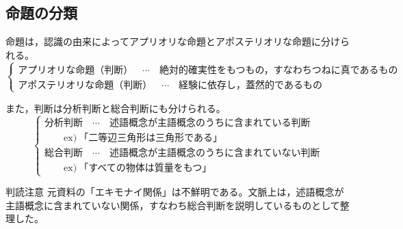 \documentclass[../main.tex]{subfiles}
\begin{document}
\subsection{命題の分類}

命題は，認識の由来によってアプリオリな命題とアポステリオリな命題に分けられる。
\[
  \left\{
  \begin{array}{l}
    \text{アプリオリな命題（判断）}
    \quad
    \cdots
    \quad
    \text{絶対的確実性をもつもの，すなわちつねに真であるもの}
    \\[1mm]
    \text{アポステリオリな命題（判断）}
    \quad
    \cdots
    \quad
    \text{経験に依存し，蓋然的であるもの}
  \end{array}
  \right.
\]

また，判断は分析判断と総合判断にも分けられる。
\[
  \left\{
  \begin{array}{l}
    \text{分析判断}
    \quad
    \cdots
    \quad
    \text{述語概念が主語概念のうちに含まれている判断}
    \\
    \qquad
    \mathrm{ex})\
    \text{「二等辺三角形は三角形である」}
    \\[1mm]
    \text{総合判断}
    \quad
    \cdots
    \quad
    \text{述語概念が主語概念のうちに含まれていない判断}
    \\
    \qquad
    \mathrm{ex})\
    \text{「すべての物体は質量をもつ」}
  \end{array}
  \right.
\]

\begin{sidebox}[TBred]{判読注意}
  元資料の「エキモナイ関係」は不鮮明である。文脈上は，述語概念が主語概念に含まれていない関係，すなわち総合判断を説明しているものとして整理した。
\end{sidebox}
\end{document}

